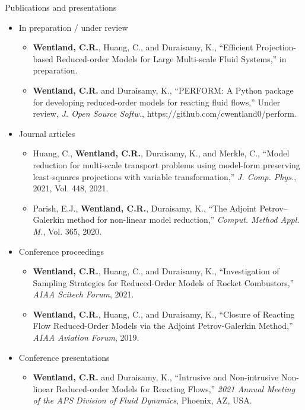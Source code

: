 \documentclass[]{beamer}
\begin{document}
\begin{frame}{Publications and presentations}
	\begin{itemize}
		\item In preparation / under review
		\vspace{0.5em}
		\begin{itemize}
			\item \tiny \textbf{Wentland, C.R.}, Huang, C., and Duraisamy, K., ``Efficient Projection-based Reduced-order Models for Large Multi-scale Fluid Systems,'' in preparation.
			\item \textbf{Wentland, C.R.} and Duraisamy, K., ``PERFORM: A Python package for developing reduced-order models for reacting fluid flows,'' Under review, \textit{J. Open Source Softw.}, https://github.com/cwentland0/perform.
		\end{itemize}
		\item \normalsize Journal articles
		\vspace{0.5em}
		\begin{itemize}
			\item \tiny Huang, C., \textbf{Wentland, C.R.}, Duraisamy, K., and Merkle, C., ``Model reduction for multi-scale transport problems using model-form preserving least-squares projections with variable transformation,'' \textit{J. Comp. Phys.}, 2021, Vol. 448, 2021.
        	\item Parish, E.J., \textbf{Wentland, C.R.}, Duraisamy, K., ``The Adjoint Petrov--Galerkin method for non-linear model reduction,'' \textit{Comput. Method Appl. M.}, Vol. 365, 2020.
		\end{itemize}
		\item \normalsize Conference proceedings
		\vspace{0.5em}
		\begin{itemize}
			\item \tiny \textbf{Wentland, C.R.}, Huang, C., and Duraisamy, K., ``Investigation of Sampling Strategies for Reduced-Order Models of Rocket Combustors,'' \textit{AIAA Scitech Forum}, 2021.
			\item \textbf{Wentland, C.R.}, Huang, C., and Duraisamy, K., ``Closure of Reacting Flow Reduced-Order Models via the Adjoint Petrov-Galerkin Method,'' \textit{AIAA Aviation Forum}, 2019.
		\end{itemize}
		\item \normalsize Conference presentations
		\vspace{0.5em}
		\begin{itemize}
			\item \tiny \textbf{Wentland, C.R.} and Duraisamy, K., ``Intrusive and Non-intrusive Non-linear Reduced-order Models for Reacting Flows,'' \textit{2021 Annual Meeting of the APS Division of Fluid Dynamics}, Phoenix, AZ, USA.

\end{itemize}
\end{itemize}
\end{frame}
\end{document}
